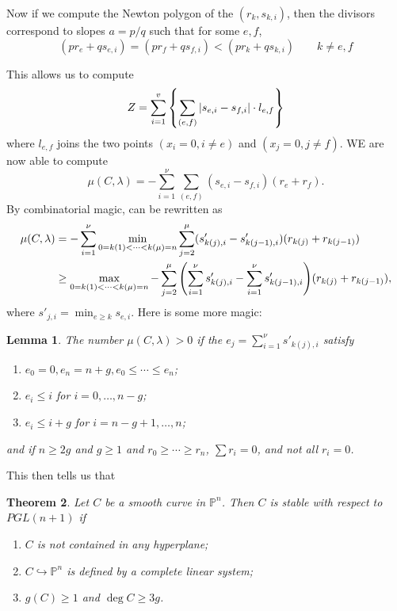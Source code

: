 \documentclass[leqno, openany]{memoir}
\newtheorem{thm}{Theorem}[section]
\newtheorem{lem}[thm]{Lemma}
\theoremstyle{definition}
\theoremstyle{remark}
\theoremstyle{plain}
\theoremstyle{definition}
\theoremstyle{remark}
\renewcommand{\P}{\mathbb{P}}
\begin{document}
Now if we compute the Newton polygon of the $(r_k, s_{k,i})$, then the divisors
correspond to slopes $a = p/q$ such that for some $e,f$, \begin{equation} (p
r_e + q s_{e,i}) = (p r_f + q s_{f,i}) < (p r_k + q s_{k,i}) \qquad k \neq e,f
\end{equation}

This allows us to compute \[ Z = \sum_{i=1}^v \qty{\sum_{\substack{(e,f)}}
    \abs{s_{e,i} - s_{f,i}} \cdot l_{e,f}} \] where $l_{e,f}$ joins the two
    points $(x_i =0, i \neq e)$ and $(x_j = 0, j \neq f)$. WE are now able to
    compute \[ \mu(C, \lambda) = - \sum_{i=1}^{\nu} \sum_{(e,f)} (s_{e,i} -
    s_{f,i}) (r_e + r_f). \] By combinatorial magic, can be rewritten as
    \begin{align*} \mu(C, \lambda) &= - \sum_{i=1}^{\nu} \min_{0 = k(1) <
        \cdots < k(\mu) = n} \sum_{j=2}^{\mu} (s'_{k(j), i} - s'_{k(j-1), i})
        (r_{k(j)} + r_{k(j-1)}) \\ &\geq \max_{0 = k(1) < \cdots < k(\mu) = n}
    - \sum_{j=2}^{\mu} \qty(\sum_{i=1}^{\nu} s'_{k(j), i} - \sum_{i=1}^{\nu}
s'_{k(j-1), i} ) (r_{k(j)} + r_{k(j-1)}), \end{align*} where $s'_{j,i} =
\min_{e \geq k} s_{e,i}$. Here is some more magic:

\begin{lem} The number $\mu(C, \lambda) > 0$ if the $e_j = \sum_{i=1}^{\nu}
    s'_{k(j), i}$ satisfy \begin{enumerate} \item $e_0 = 0, e_n = n+g, e_0 \leq
        \cdots \leq e_n$; \item $e_i \leq i$ for $i = 0, \ldots, n-g$; \item
        $e_i \leq i + g$ for $i = n-g+1, \ldots, n$; \end{enumerate} and if $n
    \geq 2g$ and $g\geq 1$ and $r_0 \geq \cdots \geq r_n$, $\sum r_i = 0$, and
not all $r_i = 0$.  \end{lem}

This then tells us that

\begin{thm} Let $C$ be a smooth curve in $\P^n$. Then $C$ is stable with
    respect to $PGL(n+1)$ if \begin{enumerate} \item $C$ is not contained in
        any hyperplane; \item $C \hookrightarrow \P^n$ is defined by a complete
        linear system; \item $g(C) \geq 1$ and $\deg C \geq 3g$.
\end{enumerate} \end{thm}
\end{document}
